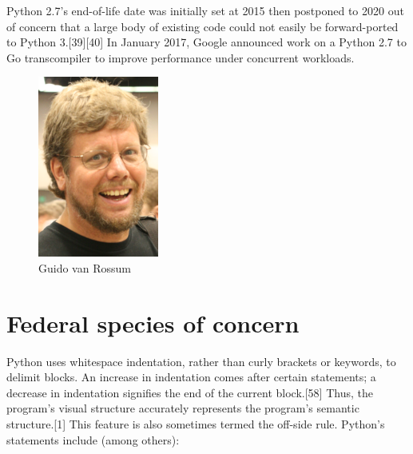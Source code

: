 \documentclass[conference]{IEEEtran} %
\begin{document}
Python 2.7's end-of-life date was initially set at 2015 then postponed to 2020 out of concern that a large body of existing code could not easily be forward-ported to Python 3.[39][40] In January 2017, Google announced work on a Python 2.7 to Go transcompiler to improve performance under concurrent workloads.
\begin{figure}[H]
        \centering
                \includegraphics[width=\linewidth]{python}
                \caption{Guido van Rossum } 
                \label{fig:python}
    \end{figure}
    \section{Federal species of concern}
Python uses whitespace indentation, rather than curly brackets or keywords, to delimit blocks. An increase in indentation comes after certain statements; a decrease in indentation signifies the end of the current block.[58] Thus, the program's visual structure accurately represents the program's semantic structure.[1] This feature is also sometimes termed the off-side rule. 
Python's statements include (among others):
\end{document}
